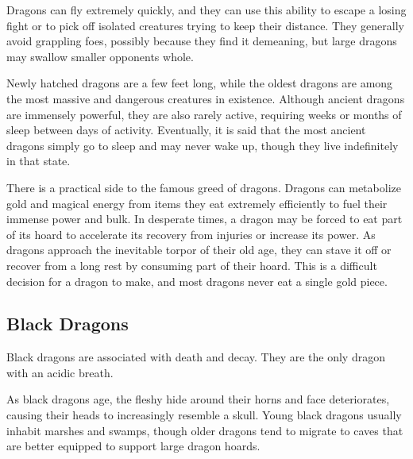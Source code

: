       Dragons can fly extremely quickly, and they can use this ability to escape a losing fight or to pick off isolated creatures trying to keep their distance.
      They generally avoid grappling foes, possibly because they find it demeaning, but large dragons may swallow smaller opponents whole.

      Newly hatched dragons are a few feet long, while the oldest dragons are among the most massive and dangerous creatures in existence.
      Although ancient dragons are immensely powerful, they are also rarely active, requiring weeks or months of sleep between days of activity.
      Eventually, it is said that the most ancient dragons simply go to sleep and may never wake up, though they live indefinitely in that state.

      There is a practical side to the famous greed of dragons.
      Dragons can metabolize gold and magical energy from items they eat extremely efficiently to fuel their immense power and bulk.
      In desperate times, a dragon may be forced to eat part of its hoard to accelerate its recovery from injuries or increase its power.
      As dragons approach the inevitable torpor of their old age, they can stave it off or recover from a long rest by consuming part of their hoard.
      This is a difficult decision for a dragon to make, and most dragons never eat a single gold piece.
  
      
    \subsection{Black Dragons}
      
      Black dragons are associated with death and decay.
      They are the only dragon with an acidic breath.
    
      As black dragons age, the fleshy hide around their horns and face deteriorates, causing their heads to increasingly resemble a skull.
      Young black dragons usually inhabit marshes and swamps, though older dragons tend to migrate to caves that are better equipped to support large dragon hoards.
    

